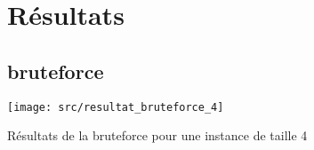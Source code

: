 \section{Résultats}
	\subsection{bruteforce}
	\begin{table}[H]
		\texttt{[image: src/resultat\_bruteforce\_4]}
		\caption{Résultats de la bruteforce pour une instance de taille 4}
	\end{table}